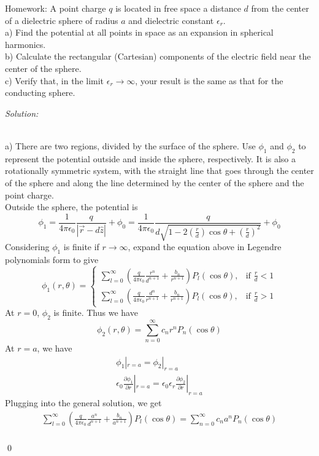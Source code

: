 \documentclass[12pt]{article}
\newenvironment{problem}[2][Problem]{\begin{trivlist}
\item[\hskip \labelsep {\bfseries #1}\hskip \labelsep {\bfseries #2.}]}{\end{trivlist}}
\newenvironment{sol}
    {\emph{Solution:}
    }
    {
    \qed
    }
\begin{document}
\begin{problem}{3}
Homework: A point charge $q$ is located in free space a distance $d$ from the center of a dielectric sphere of radius $a$ and dielectric constant $\epsilon_r$.\\
a) Find the potential at all points in space as an expansion in spherical harmonics.\\
b) Calculate the rectangular (Cartesian) components of the electric field near the center of the sphere.\\
c) Verify that, in the limit $\epsilon_r\to\infty$, your result is the same as that for the conducting sphere.
\end{problem}
\begin{sol}
\\a) There are two regions, divided by the surface of the sphere. Use $\phi_1$ and $\phi_2$ to represent the potential outside and inside the sphere, respectively. It is also a rotationally symmetric system, with the straight line that goes through the center of the sphere and along the line determined by the center of the sphere and the point charge.\\
Outside the sphere, the potential is
\[
\phi_1=\frac{1}{4\pi\epsilon_0}\frac{q}{|\vec{r}-d\hat{z}|}+\phi_0=\frac{1}{4\pi\epsilon_0}\frac{q}{d\sqrt{1-2(\frac{r}{d})\cos\theta+(\frac{r}{d})^2}}+\phi_0
\]
Considering $\phi_1$ is finite if $r\to\infty$, expand the equation above in Legendre polynomials form to give
\[
\phi_1(r,\theta)=\left\{\begin{array}{ll}
\sum_{l=0}^{\infty}(\frac{q}{4\pi\epsilon_0}\frac{r^n}{d^{n+1}}+\frac{b_n}{r^{n+1}})P_l(\cos\theta),&\text{if }\frac{r}{d}<1\\
\sum_{l=0}^{\infty}(\frac{q}{4\pi\epsilon_0}\frac{d^n}{r^{n+1}}+\frac{b_n}{r^{n+1}})P_l(\cos\theta),&\text{if }\frac{r}{d}>1
\end{array}\right.
\]
At $r=0$, $\phi_2$ is finite. Thus we have
\[
\phi_2(r,\theta)=\sum_{n=0}^{\infty}c_nr^nP_n(\cos\theta)
\]
At $r=a$, we have
\begin{gather*}
\phi_1|_{r=a}=\phi_2|_{r=a}\\
\epsilon_0\frac{\partial\phi_1}{\partial r}|_{r=a}=\epsilon_0\epsilon_r\frac{\partial\phi_2}{\partial r}|_{r=a}
\end{gather*}
Plugging into the general solution, we get
\begin{gather*}
\sum_{l=0}^{\infty}(\frac{q}{4\pi\epsilon_0}\frac{a^n}{d^{n+1}}+\frac{b_n}{a^{n+1}})P_l(\cos\theta)=\sum_{n=0}^{\infty}c_na^nP_n(\cos\theta)\\

\end{gather*}
\end{sol}
\end{document}

